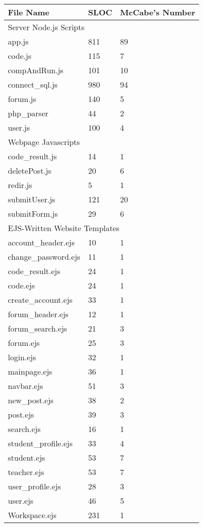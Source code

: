 \begin{tabular}{|l|l|l|}
  \hline
  File Name & SLOC & McCabe's Number\\
  \hline\hline
  \multicolumn{3}{l}{Server Node.js Scripts}\\
  \hline\hline
  app.js & 811 & 89\\
  \hline
  code.js & 115 & 7\\
  \hline
  compAndRun.js & 101 & 10\\
  \hline
  connect\_sql.js & 980 & 94\\
  \hline
  forum.js & 140 & 5\\
  \hline
  php\_parser & 44 & 2\\
  \hline
  user.js & 100 & 4\\
  \hline\hline
  \multicolumn{3}{l}{Webpage Javascripts}\\
  \hline\hline
  code\_result.js & 14 & 1\\
  \hline
  deletePost.js & 20 & 6\\
  \hline
  redir.js & 5 & 1\\
  \hline
  submitUser.js & 121 & 20\\
  \hline
  submitForm.js & 29 & 6\\
  \hline\hline
  \multicolumn{3}{l}{EJS-Written Website Templates}\\
  \hline\hline
  account\_header.ejs & 10 & 1\\
  \hline
  change\_password.ejs & 11 & 1\\
  \hline
  code\_result.ejs & 24 & 1\\
  \hline
  code.ejs & 24 & 1\\
  \hline
  create\_account.ejs & 33 & 1\\
  \hline
  forum\_header.ejs & 12 & 1\\
  \hline
  forum\_search.ejs & 21 & 3\\
  \hline
  forum.ejs & 25 & 3\\
  \hline
  login.ejs & 32 & 1\\
  \hline
  mainpage.ejs & 36 & 1\\
  \hline
  navbar.ejs & 51 & 3\\
  \hline
  new\_post.ejs & 38 & 2\\
  \hline
  post.ejs & 39 & 3\\
  \hline
  search.ejs & 16 & 1\\
  \hline
  student\_profile.ejs & 33 & 4\\
  \hline
  student.ejs & 53 & 7\\
  \hline
  teacher.ejs & 53 & 7\\
  \hline
  user\_profile.ejs & 28 & 3\\
  \hline
  user.ejs & 46 & 5 \\
  \hline
  Workspace.ejs & 231 & 1\\
  \hline
\end{tabular}
